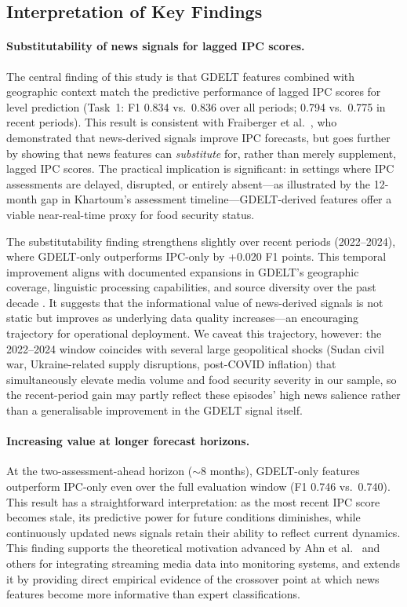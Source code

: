 \documentclass{article}
\begin{document}
\subsection{Interpretation of Key Findings}

\paragraph{Substitutability of news signals for lagged IPC scores.}
The central finding of this study is that GDELT features combined with geographic context match the predictive performance of lagged IPC scores for level prediction (Task~1: F1 0.834 vs.\ 0.836 over all periods; 0.794 vs.\ 0.775 in recent periods). This result is consistent with Fraiberger et al.~\citep{Fraiberger2023}, who demonstrated that news-derived signals improve IPC forecasts, but goes further by showing that news features can \textit{substitute} for, rather than merely supplement, lagged IPC scores. The practical implication is significant: in settings where IPC assessments are delayed, disrupted, or entirely absent---as illustrated by the 12-month gap in Khartoum's assessment timeline---GDELT-derived features offer a viable near-real-time proxy for food security status.

The substitutability finding strengthens slightly over recent periods (2022--2024), where GDELT-only outperforms IPC-only by +0.020 F1 points. This temporal improvement aligns with documented expansions in GDELT's geographic coverage, linguistic processing capabilities, and source diversity over the past decade \citep{leetaru2013gdelt}. It suggests that the informational value of news-derived signals is not static but improves as underlying data quality increases---an encouraging trajectory for operational deployment. We caveat this trajectory, however: the 2022--2024 window coincides with several large geopolitical shocks (Sudan civil war, Ukraine-related supply disruptions, post-COVID inflation) that simultaneously elevate media volume and food security severity in our sample, so the recent-period gain may partly reflect these episodes' high news salience rather than a generalisable improvement in the GDELT signal itself.

\paragraph{Increasing value at longer forecast horizons.}
At the two-assessment-ahead horizon ($\sim$8 months), GDELT-only features outperform IPC-only even over the full evaluation window (F1 0.746 vs.\ 0.740). This result has a straightforward interpretation: as the most recent IPC score becomes stale, its predictive power for future conditions diminishes, while continuously updated news signals retain their ability to reflect current dynamics. This finding supports the theoretical motivation advanced by Ahn et al.~\citep{Ahn2023} and others for integrating streaming media data into monitoring systems, and extends it by providing direct empirical evidence of the crossover point at which news features become more informative than expert classifications.
\end{document}
